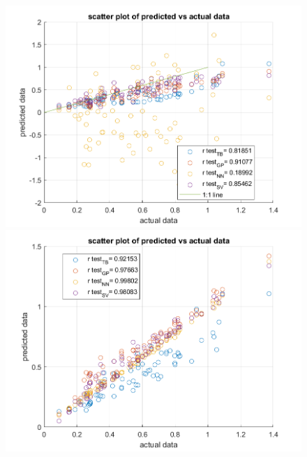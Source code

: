 \documentclass[12pt]{iopart}
\begin{document}
\begin{figure}[ht!]
\begin{center}
    \begin{minipage}{0.495\textwidth}
        \includegraphics[width=1\textwidth]{new figures/cond_wCP2500.png}
    \end{minipage}
    \begin{minipage}{0.495\textwidth}
        \includegraphics[width=1\textwidth]{new figures/cond_2500.png}
    \end{minipage}
    

\end{center}
\end{figure}
\end{document}
